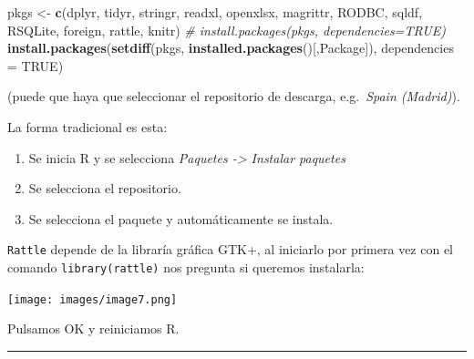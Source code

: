 \documentclass[
]{book}
\newenvironment{Shaded}{\begin{snugshade}}{\end{snugshade}}
\newcommand{\AttributeTok}[1]{\textcolor[rgb]{0.13,0.29,0.53}{#1}}
\newcommand{\CommentTok}[1]{\textcolor[rgb]{0.56,0.35,0.01}{\textit{#1}}}
\newcommand{\ConstantTok}[1]{\textcolor[rgb]{0.56,0.35,0.01}{#1}}
\newcommand{\FunctionTok}[1]{\textcolor[rgb]{0.13,0.29,0.53}{\textbf{#1}}}
\newcommand{\NormalTok}[1]{#1}
\newcommand{\OtherTok}[1]{\textcolor[rgb]{0.56,0.35,0.01}{#1}}
\newcommand{\StringTok}[1]{\textcolor[rgb]{0.31,0.60,0.02}{#1}}
\begin{document}
\begin{Shaded}
\begin{Highlighting}[]
\NormalTok{pkgs }\OtherTok{\textless{}{-}} \FunctionTok{c}\NormalTok{(}\StringTok{\textquotesingle{}dplyr\textquotesingle{}}\NormalTok{, }\StringTok{\textquotesingle{}tidyr\textquotesingle{}}\NormalTok{, }\StringTok{\textquotesingle{}stringr\textquotesingle{}}\NormalTok{, }\StringTok{\textquotesingle{}readxl\textquotesingle{}}\NormalTok{, }\StringTok{\textquotesingle{}openxlsx\textquotesingle{}}\NormalTok{, }\StringTok{\textquotesingle{}magrittr\textquotesingle{}}\NormalTok{, }
          \StringTok{\textquotesingle{}RODBC\textquotesingle{}}\NormalTok{, }\StringTok{\textquotesingle{}sqldf\textquotesingle{}}\NormalTok{, }\StringTok{\textquotesingle{}RSQLite\textquotesingle{}}\NormalTok{, }\StringTok{\textquotesingle{}foreign\textquotesingle{}}\NormalTok{, }\StringTok{\textquotesingle{}rattle\textquotesingle{}}\NormalTok{, }\StringTok{\textquotesingle{}knitr\textquotesingle{}}\NormalTok{)}
\CommentTok{\# install.packages(pkgs, dependencies=TRUE)}
\FunctionTok{install.packages}\NormalTok{(}\FunctionTok{setdiff}\NormalTok{(pkgs, }\FunctionTok{installed.packages}\NormalTok{()[,}\StringTok{\textquotesingle{}Package\textquotesingle{}}\NormalTok{]), }\AttributeTok{dependencies =} \ConstantTok{TRUE}\NormalTok{)}
\end{Highlighting}
\end{Shaded}

(puede que haya que seleccionar el repositorio de descarga, e.g.~\emph{Spain (Madrid)}).

La forma tradicional es esta:

\begin{enumerate}
\def\labelenumi{\arabic{enumi}.}
\item
  Se inicia R y se selecciona \emph{Paquetes -\textgreater{} Instalar paquetes}
\item
  Se selecciona el repositorio.
\item
  Se selecciona el paquete y automáticamente se instala.
\end{enumerate}

\texttt{Rattle} depende de la libraría gráfica GTK+, al iniciarlo por primera vez
con el comando \texttt{library(rattle)} nos pregunta si queremos instalarla:

\texttt{[image: images/image7.png]}

Pulsamos OK y reiniciamos R.

\begin{center}\rule{0.5\linewidth}{0.5pt}\end{center}
\end{document}
